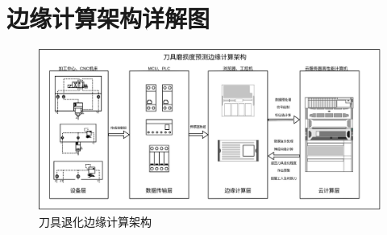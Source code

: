 \section{边缘计算架构详解图}
\begin{figure}[htp]
    \centering
    \includegraphics[width=14cm]{Chapter4/edge_compute_arch.jpg}
    \caption{刀具退化边缘计算架构}
\end{figure}
% 
